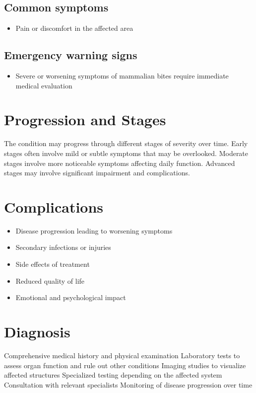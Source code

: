 \subsection{Common symptoms}
\begin{itemize}[noitemsep]
  \item Pain or discomfort in the affected area
  \end{itemize}

\subsection{Emergency warning signs}
\begin{itemize}[noitemsep]
  \item Severe or worsening symptoms of mammalian bites require immediate medical evaluation
\end{itemize}
\section{Progression and Stages}
The condition may progress through different stages of severity over time. Early stages often involve mild or subtle symptoms that may be overlooked. Moderate stages involve more noticeable symptoms affecting daily function. Advanced stages may involve significant impairment and complications.
\section{Complications}
\begin{itemize}[noitemsep]
  \item Disease progression leading to worsening symptoms
  \item Secondary infections or injuries
  \item Side effects of treatment
  \item Reduced quality of life
  \item Emotional and psychological impact
\end{itemize}
\section{Diagnosis}
Comprehensive medical history and physical examination Laboratory tests to assess organ function and rule out other conditions Imaging studies to visualize affected structures Specialized testing depending on the affected system Consultation with relevant specialists Monitoring of disease progression over time

